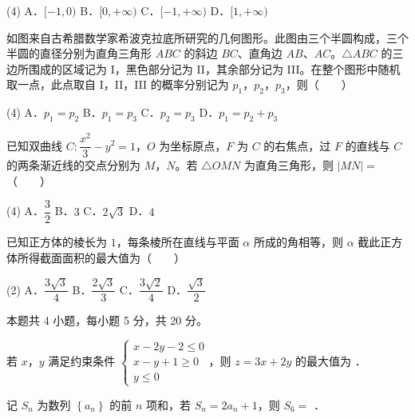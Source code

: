 \begin{gkopts}(4)
\task A．$[-1,0)$
\task B．$[0,+\infty)$
\task C．$[-1,+\infty)$
\task D．$[1,+\infty)$
\end{gkopts}

如图来自古希腊数学家希波克拉底所研究的几何图形。此图由三个半圆构成，三个半圆的直径分别为直角三角形 $ABC$ 的斜边 $BC$、直角边 $AB$、$AC$。$\triangle ABC$ 的三边所围成的区域记为 I，黑色部分记为 II，其余部分记为 III。在整个图形中随机取一点，此点取自 I，II，III 的概率分别记为 $p_1$，$p_2$，$p_3$，则（　　）

\begin{center}\end{center}

\begin{gkopts}(4)
\task A．$p_1=p_2$
\task B．$p_1=p_3$
\task C．$p_2=p_3$
\task D．$p_1=p_2+p_3$
\end{gkopts}

已知双曲线 $C:\dfrac{x^{2}}3-y^{2}=1$，$O$ 为坐标原点，$F$ 为 $C$ 的右焦点，过 $F$ 的直线与 $C$ 的两条渐近线的交点分别为 $M$，$N$。若 $\triangle OMN$ 为直角三角形，则 $|MN|=$（　　）

\begin{gkopts}(4)
\task A．$\dfrac32$
\task B．$3$
\task C．$2\sqrt3$
\task D．$4$
\end{gkopts}

已知正方体的棱长为 $1$，每条棱所在直线与平面 $\alpha$ 所成的角相等，则 $\alpha$ 截此正方体所得截面面积的最大值为（　　）

\begin{gkopts}(2)
\task A．$\dfrac{3\sqrt3}4$
\task B．$\dfrac{2\sqrt3}3$
\task C．$\dfrac{3\sqrt2}4$
\task D．$\dfrac{\sqrt3}2$
\end{gkopts}

\par\medskip


\begin{gktip}
本题共 4 小题，每小题 5 分，共 20 分。
\end{gktip}

若 $x$，$y$ 满足约束条件 $\begin{cases}x-2y-2\le0\\ x-y+1\ge0\\ y\le0\end{cases}$，则 $z=3x+2y$ 的最大值为 \gkblank{}．

记 $S_n$ 为数列 $\left\{a_n\right\}$ 的前 $n$ 项和，若 $S_n=2a_n+1$，则 $S_6=$ \gkblank{}．

